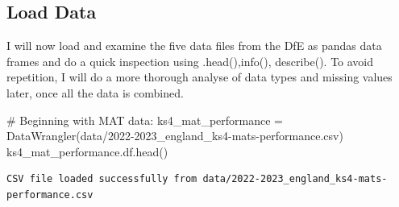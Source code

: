 \documentclass[
  letterpaper,
  DIV=11,
  numbers=noendperiod]{scrartcl}
\newenvironment{Shaded}{\begin{snugshade}}{\end{snugshade}}
\newcommand{\CommentTok}[1]{\textcolor[rgb]{0.37,0.37,0.37}{#1}}
\newcommand{\NormalTok}[1]{\textcolor[rgb]{0.00,0.23,0.31}{#1}}
\newcommand{\OperatorTok}[1]{\textcolor[rgb]{0.37,0.37,0.37}{#1}}
\newcommand{\StringTok}[1]{\textcolor[rgb]{0.13,0.47,0.30}{#1}}
\begin{document}
\subsection{Load Data}\label{load-data}

I will now load and examine the five data files from the DfE as pandas
data frames and do a quick inspection using .head(),info(), describe().
To avoid repetition, I will do a more thorough analyse of data types and
missing values later, once all the data is combined.

\begin{Shaded}
\begin{Highlighting}[]
\CommentTok{\# Beginning with MAT data:}
\NormalTok{ks4\_mat\_performance }\OperatorTok{=}\NormalTok{ DataWrangler(}\StringTok{\textquotesingle{}data/2022{-}2023\_england\_ks4{-}mats{-}performance.csv\textquotesingle{}}\NormalTok{)}
\NormalTok{ks4\_mat\_performance.df.head()}
\end{Highlighting}
\end{Shaded}

\begin{verbatim}
CSV file loaded successfully from data/2022-2023_england_ks4-mats-performance.csv
\end{verbatim}
\end{document}
